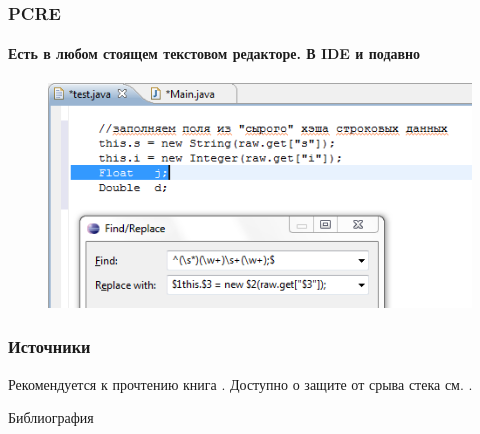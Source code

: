 \begin{frame}
    \frametitle{PCRE}
    \framesubtitle{Есть в любом стоящем текстовом редакторе. В IDE и подавно}
    \begin{figure}
        \centering
        \includegraphics[width=\textwidth]{fig/eclipseIde}
    \end{figure} 
\end{frame}
    
\appendix


\begin{frame}
    \frametitle{Источники}
    
    Рекомендуется к прочтению книга \cite{bib:howard:24}. Доступно о защите от срыва стека см. \cite{bib:misch:stackProt}.
\end{frame}


\begin{frame}[allowframebreaks]{Библиография}
    
    
\end{frame}



